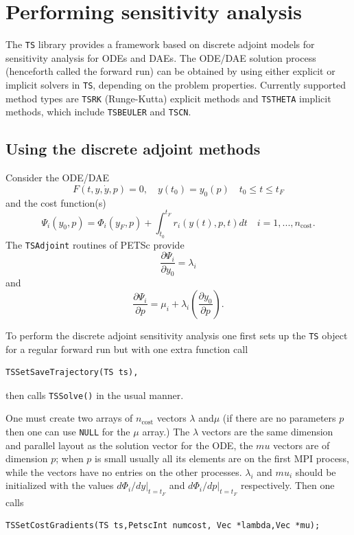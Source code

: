 \cleardoublepage
\chapter{Performing sensitivity analysis}
\label{chapter_sa}
The \lstinline{TS} library provides a framework based on discrete adjoint models
for sensitivity analysis for ODEs and DAEs.  The ODE/DAE solution
process (henceforth called the forward run) can be obtained by using
either explicit or implicit solvers in \lstinline{TS}, depending on the problem
properties. Currently supported method types are \lstinline{TSRK} (Runge-Kutta) explicit
methods and \lstinline{TSTHETA} implicit methods, which include \lstinline{TSBEULER} and \lstinline{TSCN}.

\section{Using the discrete adjoint methods}

Consider the ODE/DAE
\[
    F(t,y,\dot{y},p) = 0, \quad y(t_0)=y_0(p) \quad t_0 \le t \le t_F
\]
and the cost function(s)
\[
  \Psi_i(y_0,p) = \Phi_i(y_F,p) + \int_{t_0}^{t_F} r_i(y(t),p,t)dt \quad i=1,...,n_\text{cost}.
\]
The \lstinline{TSAdjoint} routines of PETSc provide
\[
 \frac{\partial \Psi_i}{\partial y_0} = \lambda_i
\]
and
\[
 \frac{\partial \Psi_i}{\partial p} = \mu_i + \lambda_i (\frac{\partial y_0}{\partial p}).
\]

To perform the discrete adjoint sensitivity analysis one first sets up the \lstinline{TS} object for a regular forward run but with one extra function call
\begin{lstlisting}
TSSetSaveTrajectory(TS ts),
\end{lstlisting}
then calls \lstinline{TSSolve()} in the usual manner.

One must create two arrays of $n_\text{cost}$ vectors $\lambda$ and$\mu$ (if there are no parameters $p$ then one can use \lstinline{NULL} for the $\mu$ array.) The $\lambda$ vectors are the same dimension and parallel layout as the solution vector for the ODE, the $mu$ vectors are of dimension $p$; when $p$ is small usually all its elements are on the first MPI process, while the vectors have no entries on the other processes. $\lambda_i$ and $mu_i$ should be initialized with the values $d\Phi_i/dy|_{t=t_F}$ and $d\Phi_i/dp|_{t=t_F}$ respectively. Then one calls
\begin{lstlisting}
TSSetCostGradients(TS ts,PetscInt numcost, Vec *lambda,Vec *mu);
\end{lstlisting}


